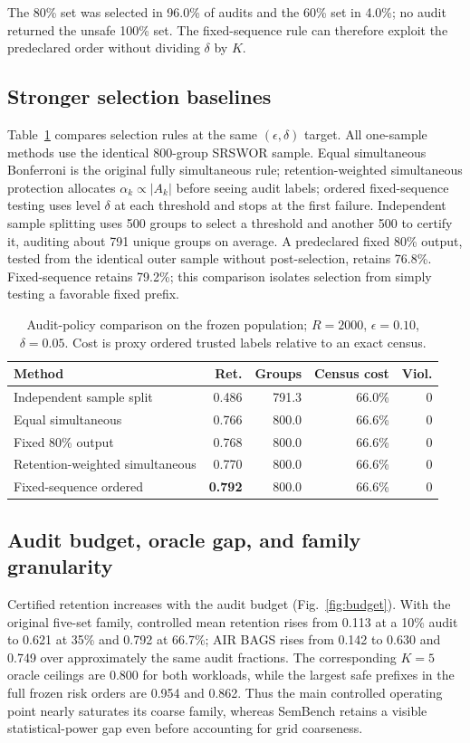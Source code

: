 \documentclass[runningheads]{llncs}
\begin{document}
The 80\% set was selected in 96.0\% of audits and the 60\% set in 4.0\%; no audit returned the unsafe 100\% set. The fixed-sequence rule can therefore exploit the predeclared order without dividing $\delta$ by $K$.

\subsection{Stronger selection baselines}
Table~\ref{tab:baselines} compares selection rules at the same $(\epsilon,\delta)$ target. All one-sample methods use the identical 800-group SRSWOR sample. Equal simultaneous Bonferroni is the original fully simultaneous rule; retention-weighted simultaneous protection allocates $\alpha_k\propto |A_k|$ before seeing audit labels; ordered fixed-sequence testing uses level $\delta$ at each threshold and stops at the first failure. Independent sample splitting uses 500 groups to select a threshold and another 500 to certify it, auditing about 791 unique groups on average. A predeclared fixed 80\% output, tested from the identical outer sample without post-selection, retains 76.8\%. Fixed-sequence retains 79.2\%; this comparison isolates selection from simply testing a favorable fixed prefix.

\begin{table}[H]
\centering
\small
\caption{Audit-policy comparison on the frozen population; $R=2000$, $\epsilon=0.10$, $\delta=0.05$. Cost is proxy ordered trusted labels relative to an exact census.}
\label{tab:baselines}
\begin{tabular}{l r r r r}
\toprule
Method & Ret. & Groups & Census cost & Viol.\\
\midrule
Independent sample split & 0.486 & 791.3 & 66.0\% & 0\\
Equal simultaneous & 0.766 & 800.0 & 66.6\% & 0\\
Fixed 80\% output & 0.768 & 800.0 & 66.6\% & 0\\
Retention-weighted simultaneous & 0.770 & 800.0 & 66.6\% & 0\\
Fixed-sequence ordered & \textbf{0.792} & 800.0 & 66.6\% & 0\\
\bottomrule
\end{tabular}
\end{table}

\subsection{Audit budget, oracle gap, and family granularity}
Certified retention increases with the audit budget (Fig.~\ref{fig:budget}). With the original five-set family, controlled mean retention rises from 0.113 at a 10\% audit to 0.621 at 35\% and 0.792 at 66.7\%; AIR BAGS rises from 0.142 to 0.630 and 0.749 over approximately the same audit fractions. The corresponding $K=5$ oracle ceilings are 0.800 for both workloads, while the largest safe prefixes in the full frozen risk orders are 0.954 and 0.862. Thus the main controlled operating point nearly saturates its coarse family, whereas SemBench retains a visible statistical-power gap even before accounting for grid coarseness.
\end{document}
